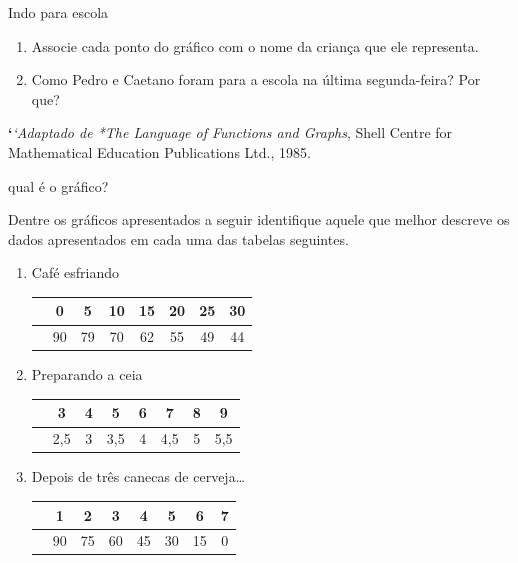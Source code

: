 \begin{task}{ Indo para escola}
\begin{enumerate}
\item {} 
Associe cada ponto do gráfico com o nome da criança que ele representa.

\item {} 
Como Pedro e Caetano foram para a escola na última segunda-feira? Por que?

\end{enumerate}

{\color{red}\bfseries{}{}`}\emph{{}`Adaptado de *The Language of Functions and Graphs}, Shell Centre for Mathematical Education Publications Ltd., 1985.

\end{task}

\begin{task}{ qual é o gráfico?}
\label{\detokenize{AF106-5:ativ-qual-e-o-grafico}}\label{\detokenize{AF106-5:atividade-qual-e-o-grafico}}

Dentre os gráficos apresentados a seguir identifique aquele que melhor descreve os dados apresentados em cada uma das tabelas seguintes.


\begin{enumerate}
\item  Café esfriando
\begin{table}[H]
\centering
\begin{tabu} to \textwidth{|c|c|c|c|c|c|c|c|}
\hline
{} & 0 & 5 & 10 & 15 & 20 & 25 & 30 \\
\hline
{} & 90 & 79 & 70 & 62 & 55 & 49 & 44\\
\hline
\end{tabu}
\end{table}

\item Preparando a ceia

\begin{table}[H]
\centering
\begin{tabu} to \textwidth{|c|c|c|c|c|c|c|c|}
\hline
{} & 3 & 4 & 5 & 6 & 7 & 8 & 9 \\
\hline
{} & 2,5 & 3 & 3,5 & 4 & 4,5 & 5 & 5,5\\
\hline
\end{tabu}
\end{table}

\item Depois de três canecas de cerveja…

\begin{table}[H]
\centering
\begin{tabu} to \textwidth{|c|c|c|c|c|c|c|c|}
\hline
{} & 1 & 2 & 3 & 4 & 5 & 6 & 7 \\
\hline
{} & 90 & 75 & 60 & 45 & 30 & 15 & 0 \\
\hline
\end{tabu}
\end{table}


\end{enumerate}
\end{task}
